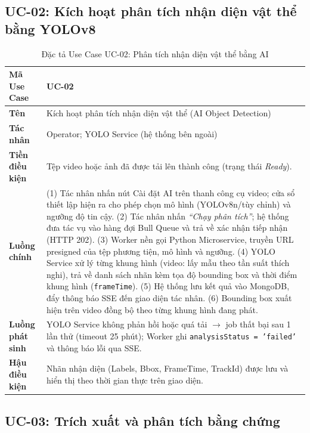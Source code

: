 \documentclass[../DoAn.tex]{subfiles}
\begin{document}
\subsection{UC-02: Kích hoạt phân tích nhận diện vật thể bằng YOLOv8}
\label{subsection:2.3.2}

\begin{longtable}{|p{3.5cm}|p{10.0cm}|}
\caption{Đặc tả Use Case UC-02: Phân tích nhận diện vật thể bằng AI}\label{tab:uc02}\\
\hline
\textbf{Mã Use Case} & UC-02 \\
\hline
\textbf{Tên} & Kích hoạt phân tích nhận diện vật thể (AI Object Detection) \\
\hline
\textbf{Tác nhân} & Operator; YOLO Service (hệ thống bên ngoài) \\
\hline
\textbf{Tiền điều kiện} & Tệp video hoặc ảnh đã được tải lên thành công (trạng thái \textit{Ready}). \\
\hline
\textbf{Luồng chính} &
(1) Tác nhân nhấn nút Cài đặt AI trên thanh công cụ video; cửa sổ thiết lập hiện ra cho phép chọn mô hình (YOLOv8n/tùy chỉnh) và ngưỡng độ tin cậy. \newline
(2) Tác nhân nhấn \textit{``Chạy phân tích''}; hệ thống đưa tác vụ vào hàng đợi Bull Queue và trả về xác nhận tiếp nhận (HTTP 202). \newline
(3) Worker nền gọi Python Microservice, truyền URL presigned của tệp phương tiện, mô hình và ngưỡng. \newline
(4) YOLO Service xử lý từng khung hình (video: lấy mẫu theo tần suất thích nghi), trả về danh sách nhãn kèm tọa độ bounding box và thời điểm khung hình (\texttt{frameTime}). \newline
(5) Hệ thống lưu kết quả vào MongoDB, đẩy thông báo SSE đến giao diện tác nhân. \newline
(6) Bounding box xuất hiện trên video đồng bộ theo từng khung hình đang phát. \\
\hline
\textbf{Luồng phát sinh} & YOLO Service không phản hồi hoặc quá tải $\to$ job thất bại sau 1 lần thử (timeout 25 phút); Worker ghi \texttt{analysisStatus = 'failed'} và thông báo lỗi qua SSE. \\
\hline
\textbf{Hậu điều kiện} & Nhãn nhận diện (Labels, Bbox, FrameTime, TrackId) được lưu và hiển thị theo thời gian thực trên giao diện. \\
\hline
\end{longtable}

\subsection{UC-03: Trích xuất và phân tích bằng chứng}
\label{subsection:2.3.3}
\end{document}
